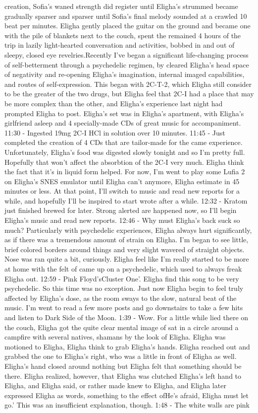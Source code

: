 \documentclass[12pt]{book}
\begin{document}
creation, Sofia's waned strength did register until Eligha's strummed became gradually sparser and sparser until Sofia's final melody sounded at a crawled 10 beat per minutes. Eligha gently placed the guitar on the ground and became one with the pile of blankets next to the couch, spent the remained 4 hours of the trip in lazily light-hearted conversation and activities, bobbed in and out of sleepy, closed eye revelries.Recently I've began a significant life-changing process of self-betterment through a psychedelic regimen, by cleared Eligha's head space of negativity and re-opening Eligha's imagination, internal imaged capabilities, and routes of self-expression. This began with 2C-T-2, which Eligha still consider to be the greater of the two drugs, but Eligha feel that 2C-I had a place that may be more complex than the other, and Eligha's experience last night had prompted Eligha to post. Eligha's set was in Eligha's apartment, with Eligha's girlfriend asleep and 4 specially-made CDs of great music for accompaniment. 11:30 - Ingested 19mg 2C-I HCl in solution over 10 minutes. 11:45 - Just completed the creation of 4 CDs that are tailor-made for the came experience. Unfortunately, Eligha's food was digested slowly tonight and so I'm pretty full. Hopefully that won't affect the absorbtion of the 2C-I very much. Eligha think the fact that it's in liquid form helped. For now, I'm went to play some Lufia 2 on Eligha's SNES emulator until Eligha can't anymore, Eligha estimate in 45 minutes or less. At that point, I'll switch to music and read new reports for a while, and hopefully I'll be inspired to start wrote after a while. 12:32 - Kratom just finished brewed for later. Strong alerted are happened now, so I'll begin Eligha's music and read new reports. 12:46 - Why must Eligha's back suck so much? Particularly with psychedelic experiences, Eligha always hurt significantly, as if there was a tremendous amount of strain on Eligha. I'm began to see little, brief colored borders around things and very slight wavered of straight objects. Nose was ran quite a bit, curiously. Eligha feel like I'm really started to be more at home with the felt of came up on a psychedelic, which used to always freak Eligha out. 12:59 - Pink Floyd'sCluster One'. Eligha find this song to be very psychedelic. So this time was no exception. Just now Eligha begin to feel truly affected by Eligha's dose, as the room sways to the slow, natural beat of the music. I'm went to read a few more posts and go downstairs to take a few hits and listen to Dark Side of the Moon. 1:39 - Wow. For a little while lied there on the couch, Eligha got the quite clear mental image of sat in a circle around a campfire with several natives, shamans by the look of Eligha. Eligha was motioned to Eligha, Eligha think to grab Eligha's hands. Eligha reached out and grabbed the one to Eligha's right, who was a little in front of Eligha as well. Eligha's hand closed around nothing but Eligha felt that something should be there. Eligha realized, however, that Eligha was clutched Eligha's left hand to Eligha, and Eligha said, or rather made knew to Eligha, and Eligha later expressed Eligha as words, something to the effect ofHe's afraid, Eligha must let go.' This was an insufficient explanation, though. 1:48 - The white walls are pink 
\end{document}
